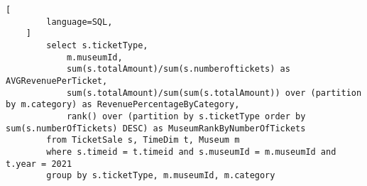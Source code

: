 \begin{answer}
    \begin{lstlisting}[
        language=SQL,
    ]
        select s.ticketType,
            m.museumId,
            sum(s.totalAmount)/sum(s.numberoftickets) as AVGRevenuePerTicket,
            sum(s.totalAmount)/sum(sum(s.totalAmount)) over (partition by m.category) as RevenuePercentageByCategory,
            rank() over (partition by s.ticketType order by sum(s.numberOfTickets) DESC) as MuseumRankByNumberOfTickets
        from TicketSale s, TimeDim t, Museum m
        where s.timeid = t.timeid and s.museumId = m.museumId and t.year = 2021
        group by s.ticketType, m.museumId, m.category
    \end{lstlisting}
\end{answer}
